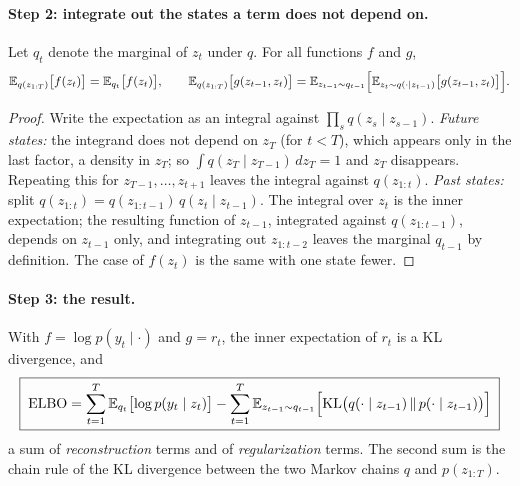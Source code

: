 \begin{notechapter}
\paragraph{Step 2: integrate out the states a term does not depend on.}

\begin{proposition}\label{em-algorithm:prop:marginalize}
Let $q_t$ denote the marginal of $z_t$ under $q$. For all functions $f$ and $g$,
\[
  \mathbb{E}_{q(z_{1:T})}\bigl[f(z_t)\bigr] = \mathbb{E}_{q_t}\bigl[f(z_t)\bigr],\qquad
  \mathbb{E}_{q(z_{1:T})}\bigl[g(z_{t-1},z_t)\bigr] = \mathbb{E}_{z_{t-1}\sim q_{t-1}}\Bigl[\mathbb{E}_{z_t\sim q(\cdot\mid z_{t-1})}\bigl[g(z_{t-1},z_t)\bigr]\Bigr].
\]
\end{proposition}

\begin{proof}
Write the expectation as an integral against $\prod_sq(z_s\mid z_{s-1})$.
\emph{Future states:} the integrand does not depend on $z_T$ (for $t<T$), which
appears only in the last factor, a density in $z_T$; so
$\int q(z_T\mid z_{T-1})\,dz_T = 1$ and $z_T$ disappears. Repeating this for
$z_{T-1},\dots,z_{t+1}$ leaves the integral against $q(z_{1:t})$. \emph{Past states:}
split $q(z_{1:t}) = q(z_{1:t-1})\,q(z_t\mid z_{t-1})$. The integral over $z_t$ is the
inner expectation; the resulting function of $z_{t-1}$, integrated against
$q(z_{1:t-1})$, depends on $z_{t-1}$ only, and integrating out $z_{1:t-2}$ leaves the
marginal $q_{t-1}$ by definition. The case of $f(z_t)$ is the same with one state
fewer.
\end{proof}

\paragraph{Step 3: the result.} With $f = \log p(y_t\mid\cdot)$ and $g = r_t$, the inner
expectation of $r_t$ is a KL divergence, and
\begin{equation}\label{em-algorithm:eq:seq-elbo}
  \boxed{\;
  \mathrm{ELBO} = \sum_{t=1}^T\mathbb{E}_{q_t}\bigl[\log p(y_t\mid z_t)\bigr]
  - \sum_{t=1}^T\mathbb{E}_{z_{t-1}\sim q_{t-1}}\Bigl[\mathrm{KL}\bigl(q(\cdot\mid z_{t-1})\,\Vert\,p(\cdot\mid z_{t-1})\bigr)\Bigr]\;}
\end{equation}
a sum of \emph{reconstruction} terms and of \emph{regularization} terms. The second
sum is the chain rule of the KL divergence between the two Markov chains $q$ and
$p(z_{1:T})$.


\end{notechapter}
